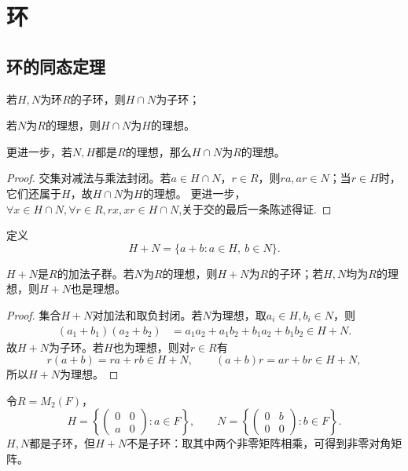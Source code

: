 \setchapterimage{}
\chapter{环}
\label{p2:ch3}

\section{环的同态定理}

\begin{proposition}
若$H,N$为环$R$的子环，则$H\cap N$为子环；

若$N$为$R$的理想，则$H\cap N$为$H$的理想。

更进一步，若$N,H$都是$R$的理想，那么$H\cap N$为$R$的理想。


\end{proposition}
\begin{proof}
交集对减法与乘法封闭。若$a\in H\cap N$，$r\in R$，则$ra,ar\in N$；当$r\in H$时，它们还属于$H$，故$H\cap N$为$H$的理想。
更进一步，$\forall x \in H\cap N,\forall r\in R,rx,xr\in H\cap N $,关于交的最后一条陈述得证.


\end{proof}

\begin{definition}
	定义
\[
H+N=\{a+b:a\in H,\ b\in N\}.
\]
\end{definition}
\begin{proposition}
	$H+N $是$R$的加法子群。若$N$为$R$的理想，则$H+N$为$R$的子环；若$H,N$均为$R$的理想，则$H+N$也是理想。
\end{proposition}
\begin{proof}
	集合$H+N$对加法和取负封闭。若$N$为理想，取$a_i\in H,b_i\in N$，则
	\begin{align*}
		(a_1+b_1)(a_2+b_2)
		&=a_1a_2+a_1b_2+b_1a_2+b_1b_2\in H+N.
	\end{align*}
	故$H+N$为子环。若$H$也为理想，则对$r\in R$有
	\[
	r(a+b)=ra+rb\in H+N,\qquad (a+b)r=ar+br\in H+N,
	\]
	所以$H+N$为理想。
\end{proof}
\begin{example}
令$R=M_2(F)$，
\[
H=\left\{\begin{pmatrix}0&0\\a&0\end{pmatrix}:a\in F\right\},\qquad
N=\left\{\begin{pmatrix}0&b\\0&0\end{pmatrix}:b\in F\right\}.
\]
$H,N$都是子环，但$H+N$不是子环：取其中两个非零矩阵相乘，可得到非零对角矩阵。
\end{example}

